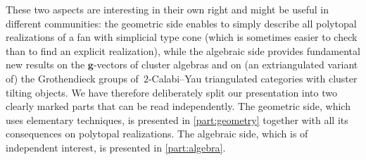 \documentclass{amsart}
\theoremstyle{definition}
\renewcommand{\b}[1]{{\boldsymbol{#1}}} %
\begin{document}
\smallskip
\noindent
These two aspects are interesting in their own right and might be useful in different communities: the geometric side enables to simply describe all polytopal realizations of a fan with simplicial type cone (which is sometimes easier to check than to find an explicit realization), while the algebraic side provides fundamental new results on the $\b{g}$-vectors of cluster algebras and on (an extriangulated variant of) the Grothendieck groups of~$2$-Calabi--Yau triangulated categories with cluster tilting objects.
We have therefore deliberately split our presentation into two clearly marked parts that can be read independently.
The geometric side, which uses elementary techniques, is presented in \cref{part:geometry} together with all its consequences on polytopal realizations.
The algebraic side, which is of independent interest, is presented in \cref{part:algebra}. 
\end{document}
